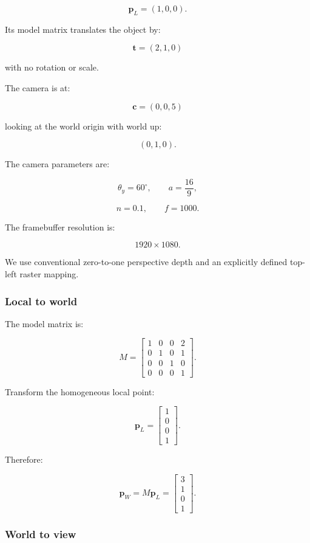 \[
 \boxed{ \mathbf p_L=(1,0,0) }.
\]

Its model matrix translates the object by:

\[
 \mathbf t=(2,1,0)
\]

with no rotation or scale.

The camera is at:

\[
 \mathbf c=(0,0,5)
\]

looking at the world origin with world up:

\[
 (0,1,0).
\]

The camera parameters are:

\[
 \theta_y=60^\circ, \qquad a=\frac{16}{9},
\]

\[
 n=0.1,\qquad f=1000.
\]

The framebuffer resolution is:

\[
 1920\times1080.
\]

We use conventional zero-to-one perspective depth and an explicitly defined top-left raster mapping.

\subsubsection{Local to world}\label{02-foundations-ii-ch037-local-to-world}

The model matrix is:

\[
 M= \begin{bmatrix} 1&0&0&2\\ 0&1&0&1\\ 0&0&1&0\\ 0&0&0&1 \end{bmatrix}.
\]

Transform the homogeneous local point:

\[
 \mathbf p_L= \begin{bmatrix} 1\\0\\0\\1 \end{bmatrix}.
\]

Therefore:

\[
 \boxed{ \mathbf p_W= M\mathbf p_L= \begin{bmatrix} 3\\1\\0\\1 \end{bmatrix} }.
\]

\subsubsection{World to view}\label{02-foundations-ii-ch037-world-to-view}

